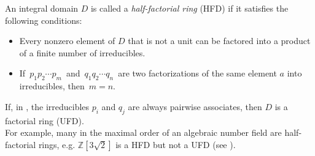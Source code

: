 \documentclass[12pt]{article}
\theoremstyle{definition}
\begin{document}
An integral domain $D$ is called a {\em half-factorial ring} (HFD) if it satisfies the following conditions:
\begin{itemize}
\item Every nonzero element of $D$ that is not a unit can be factored into a product of a finite number of irreducibles.
\item If\, $p_1p_2\cdots p_m$\, and\, $q_1q_2\cdots q_n$\, are two factorizations of the same element $a$ into irreducibles, then\, $m = n$.
\end{itemize}

If, in , the irreducibles $p_i$ and $q_j$ are always pairwise associates, then $D$ is a factorial ring (UFD).\\

For example, many  in the maximal order of an algebraic number field are half-factorial rings, e.g. $\mathbb{Z}[3\sqrt{2}]$ is a HFD but not a UFD (see ).

\end{document}
